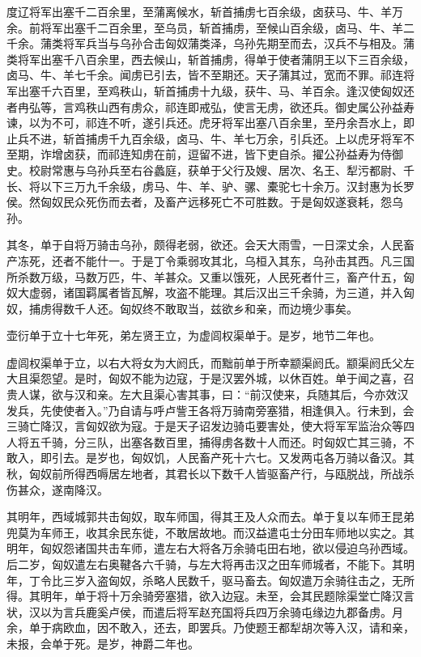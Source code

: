 \documentclass[12pt,UTF8]{ctexbook}
\begin{document}
度辽将军出塞千二百余里，至蒲离候水，斩首捕虏七百余级，卤获马、牛、羊万余。前将军出塞千二百余里，至乌员，斩首捕虏，至候山百余级，卤马、牛、羊二千余。蒲类将军兵当与乌孙合击匈奴蒲类泽，乌孙先期至而去，汉兵不与相及。蒲类将军出塞千八百余里，西去候山，斩首捕虏，得单于使者蒲阴王以下三百余级，卤马、牛、羊七千余。闻虏已引去，皆不至期还。天子蒲其过，宽而不罪。祁连将军出塞千六百里，至鸡秩山，斩首捕虏十九级，获牛、马、羊百余。逢汉使匈奴还者冉弘等，言鸡秩山西有虏众，祁连即戒弘，使言无虏，欲还兵。御史属公孙益寿谏，以为不可，祁连不听，遂引兵还。虎牙将军出塞八百余里，至丹余吾水上，即止兵不进，斩首捕虏千九百余级，卤马、牛、羊七万余，引兵还。上以虎牙将军不至期，诈增卤获，而祁连知虏在前，逗留不进，皆下吏自杀。擢公孙益寿为侍御史。校尉常惠与乌孙兵至右谷蠡庭，获单于父行及嫂、居次、名王、犁污都尉、千长、将以下三万九千余级，虏马、牛、羊、驴、骡、橐驼七十余万。汉封惠为长罗侯。然匈奴民众死伤而去者，及畜产远移死亡不可胜数。于是匈奴遂衰耗，怨乌孙。



其冬，单于自将万骑击乌孙，颇得老弱，欲还。会天大雨雪，一日深丈余，人民畜产冻死，还者不能什一。于是丁令乘弱攻其北，乌桓入其东，乌孙击其西。凡三国所杀数万级，马数万匹，牛、羊甚众。又重以饿死，人民死者什三，畜产什五，匈奴大虚弱，诸国羁属者皆瓦解，攻盗不能理。其后汉出三千余骑，为三道，并入匈奴，捕虏得数千人还。匈奴终不敢取当，兹欲乡和亲，而边境少事矣。



壶衍单于立十七年死，弟左贤王立，为虚闾权渠单于。是岁，地节二年也。



虚闾权渠单于立，以右大将女为大阏氏，而黜前单于所幸颛渠阏氏。颛渠阏氏父左大且渠怨望。是时，匈奴不能为边寇，于是汉罢外城，以休百姓。单于闻之喜，召贵人谋，欲与汉和亲。左大且渠心害其事，曰：“前汉使来，兵随其后，今亦效汉发兵，先使使者入。”乃自请与呼卢訾王各将万骑南旁塞猎，相逢俱入。行未到，会三骑亡降汉，言匈奴欲为寇。于是天子诏发边骑屯要害处，使大将军军监治众等四人将五千骑，分三队，出塞各数百里，捕得虏各数十人而还。时匈奴亡其三骑，不敢入，即引去。是岁也，匈奴饥，人民畜产死十六七。又发两屯各万骑以备汉。其秋，匈奴前所得西嗕居左地者，其君长以下数千人皆驱畜产行，与瓯脱战，所战杀伤甚众，遂南降汉。



其明年，西域城郭共击匈奴，取车师国，得其王及人众而去。单于复以车师王昆弟兜莫为车师王，收其余民东徙，不敢居故地。而汉益遣屯士分田车师地以实之。其明年，匈奴怨诸国共击车师，遣左右大将各万余骑屯田右地，欲以侵迫乌孙西域。后二岁，匈奴遣左右奥鞬各六千骑，与左大将再击汉之田车师城者，不能下。其明年，丁令比三岁入盗匈奴，杀略人民数千，驱马畜去。匈奴遣万余骑往击之，无所得。其明年，单于将十万余骑旁塞猎，欲入边寇。未至，会其民题除渠堂亡降汉言状，汉以为言兵鹿奚卢侯，而遣后将军赵充国将兵四万余骑屯缘边九郡备虏。月余，单于病欧血，因不敢入，还去，即罢兵。乃使题王都犁胡次等入汉，请和亲，未报，会单于死。是岁，神爵二年也。
\end{document}
